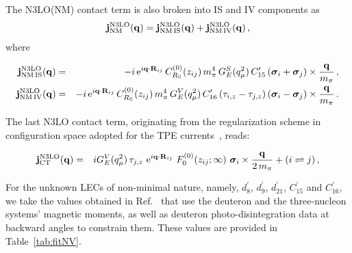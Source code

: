 \documentclass[aps,prc,floatfix,showpacs,twocolumn, preprintnumbers]{revtex4-2}
\begin{document}
The N3LO(NM) contact term is also broken into IS and IV components as
\begin{equation}
    {\bf j}^{\rm N3LO}_{\rm NM}({\bf q})={\bf j}^{\rm N3LO}_{\rm NM\, IS}({\bf q})+{\bf j}^{\rm N3LO}_{\rm NM\, IV}({\bf q})\, \label{eq:jnm},
\end{equation}
where
\begin{widetext}
\begin{eqnarray}
 {\bf j}^{\rm N3LO}_{\rm NM\,IS}({\bf q})&=& - i \, {\rm e}^{i{\bf q}\cdot{\bf R}_{ij}}\, 
C^{(0)}_{R_{\rm S}}(z_{ij}) \,  m_\pi^4\, G^S_E(q_{\mu}^2)\, C_{15}^\prime 
\left({\bm \sigma}_i+{\bm \sigma}_j\right) \times \frac{{\bf q}}{m_\pi}  \, ,\label{eq:jnm.is}\\
 {\bf j}^{\rm N3LO}_{\rm NM\, IV}({\bf q})&=& - i \, {\rm e}^{i{\bf q}\cdot{\bf R}_{ij}}\, 
C^{(0)}_{R_{\rm S}}(z_{ij}) \,  m_\pi^4\, G^V_E(q_{\mu}^2)\, C_{16}^\prime\, (\tau_{i,z} - \tau_{j,z})  \left({\bm \sigma}_i-{\bm \sigma}_j\right)
 \times \frac{{\bf q}}{m_\pi}  \, .\label{eq:jnm.iv}
\end{eqnarray}
\end{widetext}
The last N3LO contact term, originating from  the regularization scheme in configuration space adopted for the TPE currents~\cite{Schiavilla:2018udt}, reads: 
\begin{widetext}
\begin{eqnarray}
{\bf j}^{{\rm N3LO}}_{\rm CT}({\bf q})&=&
iG^V_E(q_{\mu}^2)\,\tau_{j,z}\,\, {\rm e}^{i{\bf q}\cdot {\bf R}_{ij}}
\,\, F^{(0)}_0(z_{ij};\infty)\,\, {\bm \sigma}_i  \times \frac{{\bf q}}{2\, m_\pi} 
+ (i \rightleftharpoons j) \,   , \label{eq:jloopct}
\end{eqnarray}
\end{widetext}


For the unknown LECs of non-minimal nature, namely, $d_8^\prime$, $d_9^\prime$, $d_{21}^\prime$, $C_{15}^\prime$ and $C_{16}^\prime$, we take the values obtained in Ref.~\cite{Gnech:2022vwr} that use the deuteron and the three-nucleon systems' magnetic moments, as well as deuteron photo-disintegration data at backward angles to constrain them. These values are provided in Table~\ref{tab:fitNV}.
\end{document}
